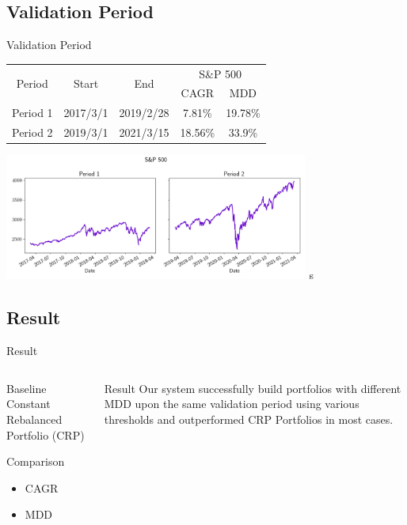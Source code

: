 \subsection{Validation Period}
\centering
\begin{frame}{Validation Period}
\begin{tabular}{||c|c|c|c|c||}
    \hline \hline
    \multirow{2}{*}{Period} &
    \multirow{2}{*}{Start} &
    \multirow{2}{*}{End} &
    \multicolumn{2}{c||}{S\&P 500} \\ 
    \cline{4-5} &{} &{} & CAGR & MDD \\ \hline \hline
    Period 1 & 2017/3/1 & 2019/2/28 & 7.81\% & 19.78\% \\ \hline
    Period 2 & 2019/3/1 & 2021/3/15 & 18.56\% & 33.9\% \\    
    \hline \hline
    \end{tabular}
      \centering
    \includegraphics[width=10cm]{images/sp500.png}
s
\end{frame}


\subsection{Result}
\begin{frame}{Result}

\begin{columns}[t]
\begin{column}{0.5\textwidth}

\begin{block}{Baseline}
Constant Rebalanced Portfolio (CRP)
\end{block}


\begin{block}{Comparison}
    \begin{itemize}
        \item CAGR
        \item MDD
    \end{itemize}
\end{block}
\end{column}

\begin{column}{0.5\textwidth}
\begin{block}{Result}
Our system successfully build portfolios with different MDD upon the same validation period using various thresholds and outperformed CRP Portfolios in most cases.
\end{block}
\end{column}
\end{columns}
\end{frame}

